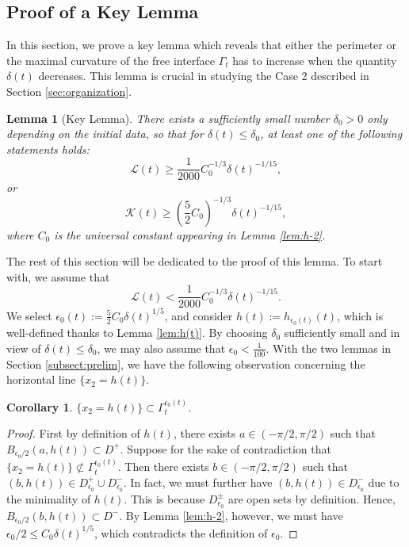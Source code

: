 \documentclass[11pt]{article}
\numberwithin{equation}{section}
\newtheorem{lem}[thm]{Lemma}
\newtheorem{cor}[thm]{Corollary}
\newcommand{\eps}{\epsilon}
\newcommand{\calL}{\mathcal{L}}
\newcommand{\calK}{\mathcal{K}}
\begin{document}
\subsection{Proof of a Key Lemma}\label{subsect:case2}
In this section, we prove a key lemma which reveals that either the perimeter or the maximal curvature of the free interface $\Gamma_t$ has to increase when the quantity $\delta(t)$ decreases. This lemma is crucial in studying the Case 2 described in Section \ref{sec:organization}.
\begin{lem}[Key Lemma]
    \label{lem:case2main2}
    There exists a sufficiently small number $\delta_0 > 0$ only depending on the initial data, so that for $\delta(t) \le \delta_0$, at least one of the following statements holds:
    \begin{equation}\label{est:largeperi}
    \calL(t) \ge \frac{1}{2000}C_0^{-1/3}\delta(t)^{-1/15},
    \end{equation}
    or
    \begin{equation}\label{est:largecur}
    \calK(t) \ge \left({\frac{5}{2}}C_0\right)^{-1/3}\delta(t)^{-1/15},
    \end{equation}
    where $C_0$ is the universal constant appearing in Lemma \ref{lem:h-2}.
    
\end{lem}
The rest of this section will be dedicated to the proof of this lemma. To start with, we assume that
\begin{equation}
    \label{est:contradiction}
    \calL(t) < \frac{1}{2000}C_0^{-1/3}\delta(t)^{-1/15}.
\end{equation}
We select $\eps_0(t) := \frac{5}{2}C_0\delta(t)^{1/5}$, and consider $h(t) := h_{\eps_0(t)}(t)$, which is well-defined thanks to Lemma \ref{lem:h(t)}. By choosing $\delta_0$ sufficiently small and in view of $\delta(t) \le \delta_0$, we may also assume that $\eps_0 < \frac{1}{100}$. With the two lemmas in Section \ref{subsect:prelim}, we have the following observation concerning the horizontal line $\{x_2 = h(t)\}$.
\begin{cor}\label{cor:h}
    $\{x_2 = h(t)\} \subset \Gamma_t^{\eps_0(t)}$.
\end{cor}
\begin{proof}
    First by definition of $h(t)$, there exists $a \in (-\pi/2, \pi/2)$ such that $B_{\eps_0/2}(a,h(t)) \subset D^+$. Suppose for the sake of contradiction that $\{x_2 = h(t)\} \not\subset \Gamma_t^{\eps_0(t)}$. Then there exists $b \in (-\pi/2, \pi/2)$ such that $(b,h(t)) \in D^+_{\eps_0} \cup D^-_{\eps_0}$. In fact, we must further have $(b,h(t)) \in D^-_{\eps_0}$ due to the minimality of $h(t)$. This is because $D_{\eps_0}^\pm$ are open sets by definition. Hence, $B_{\eps_0/2}(b,h(t)) \subset D^-$. By Lemma \ref{lem:h-2}, however, we must have $\eps_0/2 \le C_0\delta(t)^{1/5}$, which contradicts the definition of $\eps_0$.
\end{proof}
\end{document}
